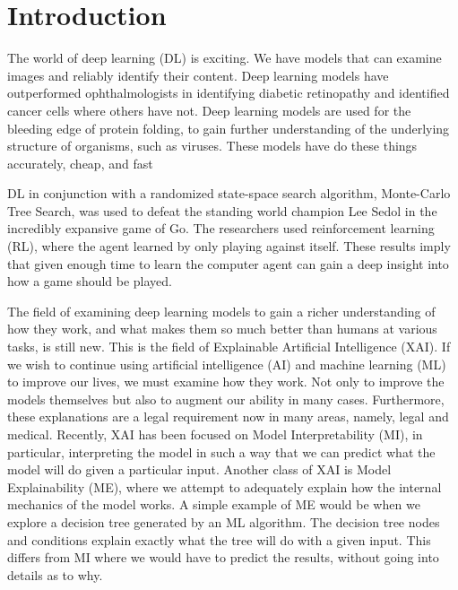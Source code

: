 \chapter{Introduction\label{cha:introduction}}

The world of deep learning (DL) is exciting. We have models that can examine images and reliably identify their content\cite{simonyan:imagerecognition}. Deep learning models have outperformed ophthalmologists in identifying diabetic retinopathy\cite{brown:retinopathy} and identified cancer cells where others have not\cite{kourou:cancer}. Deep learning models are used for the bleeding edge of protein folding, to gain further understanding of the underlying structure of organisms, such as viruses\cite{deepmind:alphafold}. These models have do these things accurately, cheap, and fast

DL in conjunction with a randomized state-space search algorithm, Monte-Carlo Tree Search, was used to defeat the standing world champion Lee Sedol in the incredibly expansive game of Go\cite{silver:alphagozero}. The researchers used reinforcement learning (RL), where the agent learned by only playing against itself. These results imply that given enough time to learn the computer agent can gain a deep insight into how a game should be played.

The field of examining deep learning models to gain a richer understanding of how they work, and what makes them so much better than humans at various tasks, is still new. This is the field of Explainable Artificial Intelligence (XAI). If we wish to continue using artificial intelligence (AI) and machine learning (ML) to improve our lives, we must examine how they work. Not only to improve the models themselves but also to augment our ability in many cases. Furthermore, these explanations are a legal requirement now in many areas\cite{legalexplanation:goodman}, namely, legal and medical. Recently, XAI has been focused on Model Interpretability (MI), in particular, interpreting the model in such a way that we can predict what the model will do given a particular input\cite{riberio:recentxai1}. Another class of XAI is Model Explainability (ME), where we attempt to adequately explain how the internal mechanics of the model works. A simple example of ME would be when we explore a decision tree generated by an ML algorithm. The decision tree nodes and conditions explain exactly what the tree will do with a given input. This differs from MI where we would have to predict the results, without going into details as to why.

